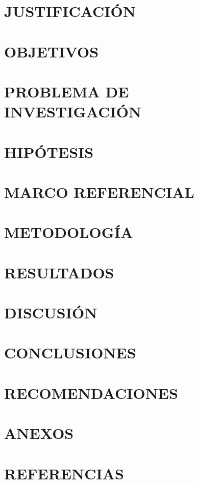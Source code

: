 	\section{JUSTIFICACIÓN}
	
	\newpage
	
	\section{OBJETIVOS}
	
	
	
	\newpage
	
	\section{PROBLEMA DE INVESTIGACIÓN}
	
	\newpage
	
	\section{HIPÓTESIS}
	
	
	\section{MARCO REFERENCIAL}
	
	
	\section{METODOLOGÍA}
	
	
	\section{RESULTADOS}
	
	\newpage
	
	\section{DISCUSIÓN}
	
	\newpage
	
	\section{CONCLUSIONES}
	
	
	\section{RECOMENDACIONES}
	
	
	\section{ANEXOS}
	
	
	\cleardoublepage{}
	
	\section{REFERENCIAS}
	\begingroup
	\renewcommand{\section}[2]{}%
	\printbibliography[heading=none]
	\endgroup
	
